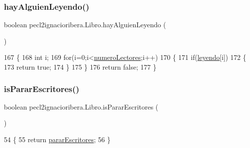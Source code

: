 \subsubsection{\texorpdfstring{hay\+Alguien\+Leyendo()}{hayAlguienLeyendo()}}
{\footnotesize\ttfamily boolean pecl2ignacioribera.\+Libro.\+hay\+Alguien\+Leyendo (\begin{DoxyParamCaption}{ }\end{DoxyParamCaption})\hspace{0.3cm}{\ttfamily [inline]}}


\begin{DoxyCode}
167     \{
168         \textcolor{keywordtype}{int} i;
169         \textcolor{keywordflow}{for}(i=0;i<\mbox{\hyperlink{classpecl2ignacioribera_1_1_libro_a8c1b217886e7be49de89d57c5ef47c7e}{numeroLectores}};i++)
170         \{
171             \textcolor{keywordflow}{if}(\mbox{\hyperlink{classpecl2ignacioribera_1_1_libro_adc1f39f45ab2ae4174206c9ee53f2f97}{leyendo}}[i])
172             \{
173                 \textcolor{keywordflow}{return} \textcolor{keyword}{true};
174             \}
175         \}
176         \textcolor{keywordflow}{return} \textcolor{keyword}{false};
177     \}
\end{DoxyCode}
\mbox{\label{classpecl2ignacioribera_1_1_libro_aabc572905978f8f3e19dd6533084149a}} 
\subsubsection{\texorpdfstring{is\+Parar\+Escritores()}{isPararEscritores()}}
{\footnotesize\ttfamily boolean pecl2ignacioribera.\+Libro.\+is\+Parar\+Escritores (\begin{DoxyParamCaption}{ }\end{DoxyParamCaption})\hspace{0.3cm}{\ttfamily [inline]}}


\begin{DoxyCode}
54                                        \{
55         \textcolor{keywordflow}{return} \mbox{\hyperlink{classpecl2ignacioribera_1_1_libro_a8925b951b1b46dc4c3620730cd28480a}{pararEscritores}};
56     \}
\end{DoxyCode}
\mbox{\label{classpecl2ignacioribera_1_1_libro_a5d5ef2c83d96944b1d043e9fb5378edd}} 
